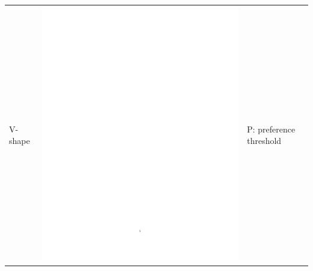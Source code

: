 \begin{enumerate}
\begin{table}[h!]
\begin{center}
\begin{tabular}{|l|c|b{4.2cm}|}
\hline V-shape & \includegraphics[page=2,trim=7.5cm 14cm 5cm 7cm,clip,scale=0.4]{prom_vshape_pdf} & P: preference threshold\\

\end{tabular}
\end{center}
\end{table}
\end{enumerate}
